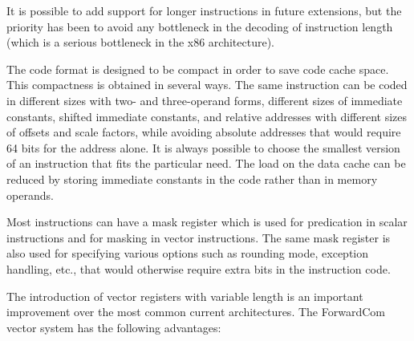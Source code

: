 \documentclass[forwardcom.tex]{subfiles}
\begin{document}
It is possible to add support for longer instructions in future extensions, but the priority has been to avoid any bottleneck in the decoding of instruction length (which is a serious bottleneck in the x86 architecture). 
\vv

The code format is designed to be compact in order to save code cache space. This compactness is obtained in several ways. The same instruction can be coded in different sizes with two- and three-operand forms, different sizes of immediate constants, shifted immediate constants, and relative addresses with different sizes of offsets and scale factors, while avoiding absolute addresses that would require 64 bits for the address alone. It is always possible to choose the smallest version of an instruction that fits the particular need. The load on the data cache can be reduced by storing immediate constants in the code rather than in memory operands.
\vv

Most instructions can have a mask register which is used for predication in scalar instructions and for masking in vector instructions. The same mask register is also used for specifying various options such as rounding mode, exception handling, etc., that would otherwise require extra bits in the instruction code. 
\vv

The introduction of vector registers with variable length is an important improvement over the most common current architectures. The ForwardCom vector system has the following advantages: 
\end{document}
